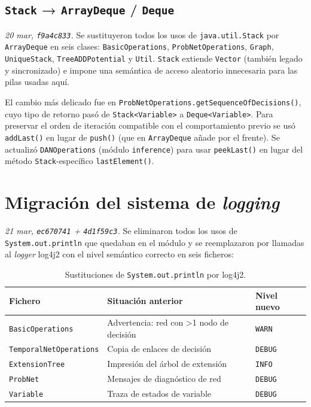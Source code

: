 \documentclass[11pt,a4paper]{article}
\begin{document}
\subsection{\texttt{Stack} → \texttt{ArrayDeque} / \texttt{Deque}}

\emph{20 mar, \texttt{f9a4c833}.}
Se sustituyeron todos los usos de \texttt{java.util.Stack} por \texttt{ArrayDeque} en seis clases:
\texttt{BasicOperations}, \texttt{ProbNetOperations}, \texttt{Graph}, \texttt{UniqueStack},
\texttt{TreeADDPotential} y \texttt{Util}. \texttt{Stack} extiende \texttt{Vector} (también legado
y sincronizado) e impone una semántica de acceso aleatorio innecesaria para las pilas usadas aquí.

El cambio más delicado fue en \texttt{ProbNetOperations.getSequenceOfDecisions()}, cuyo tipo de
retorno pasó de \texttt{Stack<Variable>} a \texttt{Deque<Variable>}. Para preservar el orden de
iteración compatible con el comportamiento previo se usó \texttt{addLast()} en lugar de
\texttt{push()} (que en \texttt{ArrayDeque} añade por el frente). Se actualizó
\texttt{DANOperations} (módulo \texttt{inference}) para usar \texttt{peekLast()} en lugar del
método \texttt{Stack}-específico \texttt{lastElement()}.

\section{Migración del sistema de \emph{logging}}

\emph{21 mar, \texttt{ec670741} + \texttt{4d1f59c3}.}
Se eliminaron todos los usos de \texttt{System.out.println} que quedaban en el módulo y se
reemplazaron por llamadas al \emph{logger} log4j2 con el nivel semántico correcto en seis ficheros:

\begin{table}[!htbp]
\centering
\begin{tabular}{lll}
\toprule
\textbf{Fichero} & \textbf{Situación anterior} & \textbf{Nivel nuevo} \\
\midrule
\texttt{BasicOperations}      & Advertencia: red con >1 nodo de decisión   & \texttt{WARN}  \\
\texttt{TemporalNetOperations}& Copia de enlaces de decisión               & \texttt{DEBUG} \\
\texttt{ExtensionTree}        & Impresión del árbol de extensión           & \texttt{INFO}  \\
\texttt{ProbNet}              & Mensajes de diagnóstico de red             & \texttt{DEBUG} \\
\texttt{Variable}             & Traza de estados de variable               & \texttt{DEBUG} \\
\bottomrule
\end{tabular}
\caption{Sustituciones de \texttt{System.out.println} por log4j2.}
\end{table}
\end{document}
